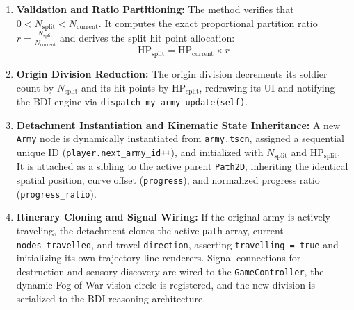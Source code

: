 \begin{enumerate}
    \item \textbf{Validation and Ratio Partitioning:} The method verifies that $0 < N_{\text{split}} < N_{\text{current}}$. It computes the exact proportional partition ratio $r = \frac{N_{\text{split}}}{N_{\text{current}}}$ and derives the split hit point allocation:
    \begin{equation}
        \text{HP}_{\text{split}} = \text{HP}_{\text{current}} \times r
    \end{equation}
    \item \textbf{Origin Division Reduction:} The origin division decrements its soldier count by $N_{\text{split}}$ and its hit points by $\text{HP}_{\text{split}}$, redrawing its UI and notifying the BDI engine via \texttt{dispatch\_my\_army\_update(self)}.
    \item \textbf{Detachment Instantiation and Kinematic State Inheritance:} A new \texttt{Army} node is dynamically instantiated from \texttt{army.tscn}, assigned a sequential unique ID (\texttt{player.next\_army\_id++}), and initialized with $N_{\text{split}}$ and $\text{HP}_{\text{split}}$. It is attached as a sibling to the active parent \texttt{Path2D}, inheriting the identical spatial position, curve offset (\texttt{progress}), and normalized progress ratio (\texttt{progress\_ratio}).
    \item \textbf{Itinerary Cloning and Signal Wiring:} If the original army is actively traveling, the detachment clones the active \texttt{path} array, current \texttt{nodes\_travelled}, and travel \texttt{direction}, asserting \texttt{travelling = true} and initializing its own trajectory line renderers. Signal connections for destruction and sensory discovery are wired to the \texttt{GameController}, the dynamic Fog of War vision circle is registered, and the new division is serialized to the BDI reasoning architecture.
\end{enumerate}

